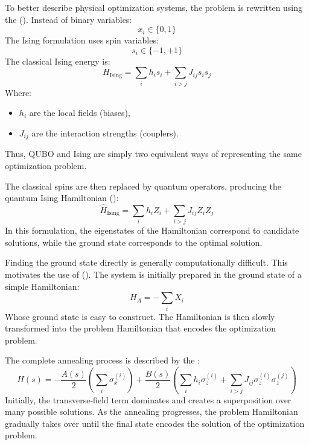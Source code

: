 \highspace
To better describe physical optimization systems, the problem is rewritten using the  (). Instead of binary variables:
\begin{equation*}
    x_i\in\{0,1\}
\end{equation*}
The Ising formulation uses spin variables:
\begin{equation*}
    s_i\in\{-1,+1\}
\end{equation*}
The classical Ising energy is:
\begin{equation*}
    H_{\text{Ising}}
    =
    \sum_i h_i s_i
    +
    \sum_{i>j} J_{ij}s_is_j
\end{equation*}
Where:
\begin{itemize}
    \item $h_i$ are the local fields (biases),
    \item $J_{ij}$ are the interaction strengths (couplers).
\end{itemize}
Thus, QUBO and Ising are simply two equivalent ways of representing the same optimization problem.

\highspace
The classical spins are then replaced by quantum operators, producing the quantum Ising Hamiltonian ():
\begin{equation*}
    \hat H_{\text{Ising}}
    =
    \sum_i h_i Z_i
    +
    \sum_{i>j} J_{ij} Z_i Z_j
\end{equation*}
In this formulation, the eigenstates of the Hamiltonian correspond to candidate solutions, while the ground state corresponds to the optimal solution.

\highspace
Finding the ground state directly is generally computationally difficult. This motivates the use of  (). The system is initially prepared in the ground state of a simple Hamiltonian:
\begin{equation*}
    H_A = -\sum_i X_i
\end{equation*}
Whose ground state is easy to construct. The Hamiltonian is then slowly transformed into the problem Hamiltonian that encodes the optimization problem.

\highspace
The complete annealing process is described by the :
\begin{equation*}
    H(s)
    =
    -\frac{A(s)}{2}
    \left(\sum_i \sigma_x^{(i)}\right)
    +
    \frac{B(s)}{2}
    \left(
        \sum_i h_i \sigma_z^{(i)}
        +
        \sum_{i>j} J_{ij}\sigma_z^{(i)}\sigma_z^{(j)}
    \right)
\end{equation*}
Initially, the transverse-field term dominates and creates a superposition over many possible solutions. As the annealing progresses, the problem Hamiltonian gradually takes over until the final state encodes the solution of the optimization problem.

